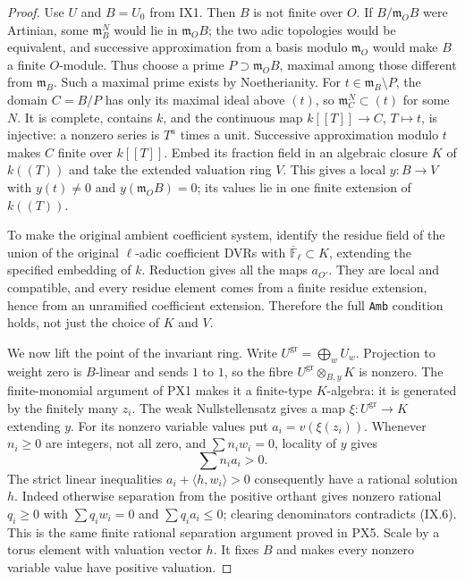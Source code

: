 \begin{proof}
Use $U$ and $B=U_0$ from IX1.  Then $B$ is not finite over
$O$.  If $B/\mathfrak m_OB$ were Artinian, some
$\mathfrak m_B^N$ would lie in $\mathfrak m_OB$; the two
adic topologies would be equivalent, and successive
approximation from a basis modulo $\mathfrak m_O$ would
make $B$ a finite $O$-module.  Thus choose a prime
$P\supset\mathfrak m_OB$, maximal among those different
from $\mathfrak m_B$.  Such a maximal prime exists by
Noetherianity.  For $t\in\mathfrak m_B\setminus P$, the
domain $C=B/P$ has only its maximal ideal above $(t)$,
so $\mathfrak m_C^N\subset(t)$ for some $N$.
It is complete, contains $k$, and the continuous map
$k[[T]]\to C$, $T\mapsto t$, is injective: a nonzero series
is $T^a$ times a unit.  Successive approximation modulo
$t$ makes $C$ finite over $k[[T]]$.
Embed its fraction field in an algebraic closure
$K$ of $k((T))$ and take the extended valuation ring $V$.
This gives a local $y:B\to V$ with $y(t)\ne0$ and
$y(\mathfrak m_OB)=0$; its values lie in one finite extension
of $k((T))$.

To make the original ambient coefficient system, identify
the residue field of the union of the original $\ell$-adic
coefficient DVRs with $\overline{\mathbb F}_\ell\subset K$,
extending the specified embedding of $k$.  Reduction gives
all the maps $a_{O'}$.  They are local and compatible, and
every residue element comes from a finite residue extension,
hence from an unramified coefficient extension.  Therefore
the full \texttt{Amb} condition holds, not just the choice
of $K$ and $V$.

We now lift the point of the invariant ring.  Write
$U^{\mathrm{gr}}=\bigoplus_wU_w$.  Projection to weight zero
is $B$-linear and sends $1$ to $1$, so the fibre
$U^{\mathrm{gr}}\otimes_{B,y}K$ is nonzero.  The
finite-monomial argument of PX1 makes it a finite-type
$K$-algebra: it is generated by the finitely many $z_i$.
The weak Nullstellensatz gives a map
$\xi:U^{\mathrm{gr}}\to K$ extending $y$.
For its nonzero variable values put $a_i=v(\xi(z_i))$.
Whenever $n_i\ge0$ are integers, not all zero, and
$\sum n_iw_i=0$, locality of $y$ gives
\[
                         \sum n_i a_i>0.
 \tag{IX.6}
\]
The strict linear inequalities
$a_i+\langle h,w_i\rangle>0$ consequently have a rational
solution $h$.  Indeed otherwise separation from the positive
orthant gives nonzero rational $q_i\ge0$ with
$\sum q_iw_i=0$ and $\sum q_i a_i\le0$; clearing denominators
contradicts (IX.6).  This is the same finite rational
separation argument proved in PX5.
Scale by a torus element with valuation vector $h$.
It fixes $B$ and makes every nonzero variable value have
positive valuation.


\end{proof}
